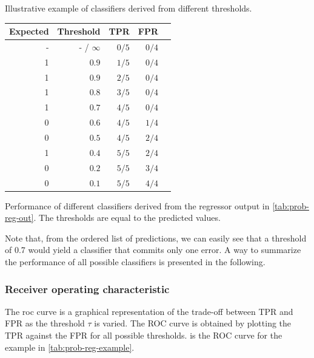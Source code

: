 \begin{tablebox}[label=tab:prob-reg-example]{Illustrative example of \glspl{classifier} derived
  from different thresholds.}
  \centering
  \begin{tabular}{rrrrr}
    \toprule
    \textbf{Expected} & \textbf{Threshold} & \textbf{TPR} & \textbf{FPR}  \\
    \midrule
    - & - / $\infty$ & $0/5$ & $0/4$ \\
    1 & $0.9$        & $1/5$ & $0/4$ \\
    1 & $0.9$        & $2/5$ & $0/4$ \\
    1 & $0.8$        & $3/5$ & $0/4$ \\
    1 & $0.7$        & $4/5$ & $0/4$ \\
    0 & $0.6$        & $4/5$ & $1/4$ \\
    0 & $0.5$        & $4/5$ & $2/4$ \\
    1 & $0.4$        & $5/5$ & $2/4$ \\
    0 & $0.2$        & $5/5$ & $3/4$ \\
    0 & $0.1$        & $5/5$ & $4/4$ \\
    \bottomrule
  \end{tabular}
  \tcblower
  Performance of different \glspl{classifier} derived from the \gls{regressor} output in
  \cref{tab:prob-reg-out}.  The thresholds are equal to the predicted values.
\end{tablebox}

Note that, from the ordered list of predictions, we can easily see that a threshold of 0.7
would yield a \gls{classifier} that commits only one error.  A way to summarize the performance
of all possible \glspl{classifier} is presented in the following.

\subsubsection{Receiver operating characteristic}

The \gls{roc} curve is a graphical representation of the
trade-off between TPR and FPR as the threshold
$\tau$ is varied.  The ROC curve is obtained by plotting the TPR against the FPR for all
possible thresholds.   is the ROC curve for the example in
\cref{tab:prob-reg-example}.

